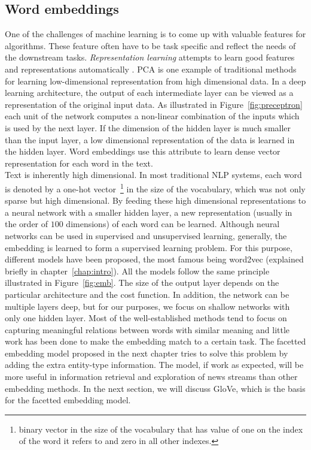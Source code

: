 \subsection{Word embeddings}\label{subsec:wordembeddings}
One of the challenges of machine learning is to come up with valuable features for algorithms. These feature often have to be task specific and reflect the needs of the downstream tasks. \emph{Representation learning} attempts to learn good features and representations automatically \cite{DBLP:journals/corr/ZhongWD16}. PCA is one example of traditional methods for learning low-dimensional representation from high dimensional data. In a deep learning architecture, the output of each intermediate layer can be viewed as a representation of the original input data. As illustrated in Figure~\ref{fig:preceptron} each unit of the network computes a non-linear combination of the inputs which is used by the next layer. If the dimension of the hidden layer is much smaller than the input layer, a low dimensional representation of the data is learned in the hidden layer. Word embeddings use this attribute to learn dense vector representation for each word in the text.\\
\noindent
Text is inherently high dimensional. In most traditional NLP systems, each word is denoted by a one-hot vector~\footnote{binary vector in the size of the vocabulary that has value of one on the index of the word it refers to and zero in all other indexes.} in the size of the vocabulary, which was not only sparse but high dimensional. By feeding these high dimensional representations to a neural network with a smaller hidden layer, a new representation (usually in the order of $100$ dimensions) of each word can be learned. Although neural networks can be used in supervised and unsupervised learning, generally, the embedding is
learned to form a supervised learning problem. For this purpose, different models have been proposed, the most famous being word2vec (explained briefly in chapter~\ref{chap:intro}). All the models follow the same principle illustrated in Figure~\ref{fig:emb}. The size of the output layer depends on the particular architecture and the cost function. In addition, the network can be multiple layers deep, but for our purposes, we focus on shallow networks with only one hidden layer. Most of the well-established methods tend to focus on capturing meaningful relations between words with similar meaning and little work has been done to make the embedding match to a certain task. The facetted embedding model proposed in the next chapter tries to solve this problem by adding the extra entity-type information. The model, if work as expected, will be more useful in information retrieval and exploration of news streams than other embedding methods. In the next section, we will discuss GloVe, which is the basis for the facetted embedding model.
